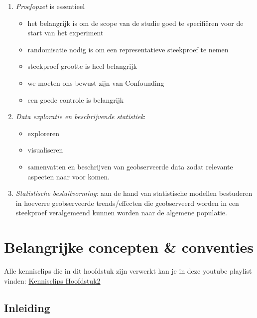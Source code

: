 \documentclass[
  12pt,dutch,coursenotes]{book}
\providecommand{\tightlist}{%
  \setlength{\itemsep}{0pt}\setlength{\parskip}{0pt}}
\theoremstyle{definition}
\theoremstyle{definition}
\theoremstyle{definition}
\theoremstyle{remark}
\begin{document}
\begin{enumerate}
\def\labelenumi{\arabic{enumi}.}
\item
  \emph{Proefopzet} is essentieel

  \begin{itemize}
  \item
    het belangrijk is om de scope van de studie goed te specifiëren voor de start van het experiment
  \item
    randomisatie nodig is om een representatieve steekproef te nemen
  \item
    steekproef grootte is heel belangrijk
  \item
    we moeten ons bewust zijn van Confounding
  \item
    een goede controle is belangrijk
  \end{itemize}
\item
  \emph{Data exploratie en beschrijvende statistiek}:

  \begin{itemize}
  \tightlist
  \item
    exploreren
  \item
    visualiseren
  \item
    samenvatten en beschrijven van geobserveerde data zodat relevante aspecten naar voor komen.
  \end{itemize}
\item
  \emph{Statistische besluitvorming}: aan de hand van statistische modellen bestuderen in hoeverre geobserveerde trends/effecten die geobserveerd worden in een steekproef veralgemeend kunnen worden naar de algemene populatie.
\end{enumerate}

\hypertarget{belangrijke-concepten-conventies}{%
\chapter{Belangrijke concepten \& conventies}\label{belangrijke-concepten-conventies}}

Alle kennisclips die in dit hoofdstuk zijn verwerkt kan je in deze youtube playlist vinden: \href{https://www.youtube.com/playlist?list=PLZH1hP8_LbJJ7apU5sAbRlUsve2nWz5ev}{Kennisclips Hoofdstuk2}

\hypertarget{inleiding}{%
\section{Inleiding}\label{inleiding}}
\end{document}
